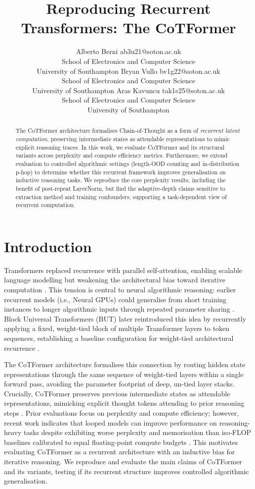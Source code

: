 \documentclass[10pt]{article}
\title{Reproducing Recurrent Transformers: The CoTFormer}
\author{\name Alberto Berni \email ab3u21@soton.ac.uk \\
      \addr School of Electronics and Computer Science\\
      University of Southampton
      \AND
      \name Bryan Vullo \email bv1g22@soton.ac.uk \\
      \addr School of Electronics and Computer Science\\
      University of Southampton
      \AND
      \name Aras Kavuncu \email tak1e25@soton.ac.uk \\
      \addr School of Electronics and Computer Science\\
      University of Southampton}
\begin{document}
\maketitle

\begin{abstract}
The CoTFormer architecture formalises Chain-of-Thought as a form of \emph{recurrent latent computation}, preserving intermediate states as attendable representations to mimic explicit reasoning traces. In this work, we evaluate CoTFormer and its structural variants across perplexity and compute efficiency metrics. Furthermore, we extend evaluation to controlled algorithmic settings (length-OOD counting and in-distribution p-hop) to determine whether this recurrent framework improves generalisation on inductive reasoning tasks.
We reproduce the core perplexity results, including the benefit of post-repeat LayerNorm, but find the adaptive-depth claims sensitive to extraction method and training confounders, supporting a task-dependent view of recurrent computation.
\end{abstract}

\section{Introduction}\label{sec:intro} 

Transformers replaced recurrence with parallel self-attention, enabling scalable language modelling but weakening the architectural bias toward iterative computation \citep{vaswani2017attention}. This tension is central to neural algorithmic reasoning: earlier recurrent models (i.e., Neural GPUs) could generalise from short training instances to longer algorithmic inputs through repeated parameter sharing \citep{kaiser2016neural}. Block Universal Transformers (BUT) later reintroduced this idea by recurrently applying a fixed, weight-tied block of multiple Transformer layers to token sequences, establishing a baseline configuration for weight-tied architectural recurrence \citep{dehghani2019universal}.

The CoTFormer architecture formalises this connection by routing hidden state representations through the same sequence of weight-tied layers within a single forward pass, avoiding the parameter footprint of deep, un-tied layer stacks. Crucially, CoTFormer preserves previous intermediate states as attendable representations, mimicking explicit thought tokens attending to prior reasoning steps \citep{cotformer}. Prior evaluations focus on perplexity and compute efficiency; however, recent work indicates that looped models can improve performance on reasoning-heavy tasks despite exhibiting worse perplexity and memorisation than iso-FLOP baselines calibrated to equal floating-point compute budgets \citep{saunshi2025reasoning}. This motivates evaluating CoTFormer as a recurrent architecture with an inductive bias for iterative reasoning. We reproduce and evaluate the main claims of CoTFormer and its variants, testing if its recurrent structure improves controlled algorithmic generalisation.
\end{document}
